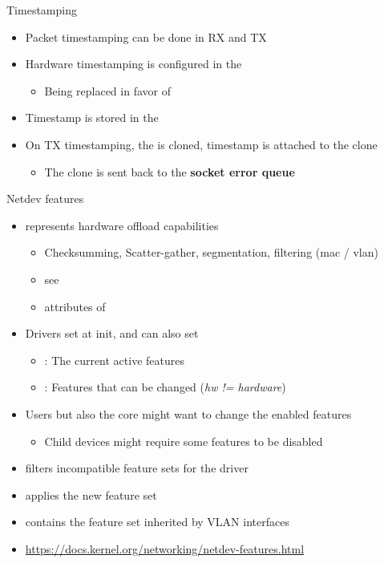 \begin{frame}{Timestamping}
	\begin{itemize}
		\item Packet timestamping can be done in RX and TX
		\item Hardware timestamping is configured in the 
			\begin{itemize}
				\item Being replaced in favor of 
			\end{itemize}
		\item Timestamp is stored in the 
		\item On TX timestamping, the  is cloned, timestamp is attached to the clone
			\begin{itemize}
				\item The clone is sent back to the \textbf{socket error queue}
			\end{itemize}
	\end{itemize}
\end{frame}

\begin{frame}{Netdev features}
	\begin{itemize}
		\item {} represents hardware offload capabilities
			\begin{itemize}
				\item Checksumming, Scatter-gather, segmentation, filtering (mac / vlan)
				\item see 
				\item attributes of 
			\end{itemize}
		\item Drivers set  at init, and can also set 
			\begin{itemize}
				\item {} : The current active features
				\item {} : Features that can be changed (\textit{hw != hardware})
			\end{itemize}
		\item Users but also the core might want to change the enabled features
			\begin{itemize}
				\item Child devices might require some features to be disabled
			\end{itemize}
		\item {} filters incompatible feature sets for the driver
		\item {} applies the new feature set
		\item {} contains the feature set inherited by VLAN interfaces
		\item \url{https://docs.kernel.org/networking/netdev-features.html}
	\end{itemize}
\end{frame}


